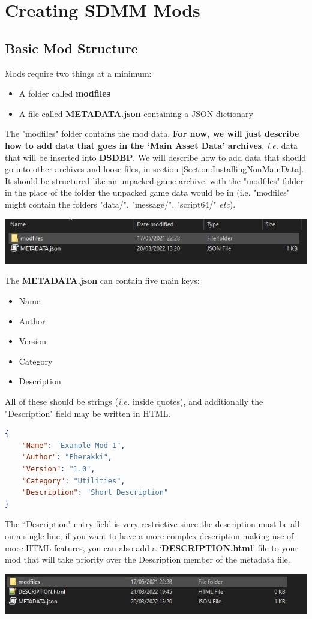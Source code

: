 \documentclass{article}
\begin{document}
\section{Creating SDMM Mods}
\subsection{Basic Mod Structure}
Mods require two things at a minimum:
\begin{itemize}
\item A folder called \textbf{modfiles}
\item A file called \textbf{METADATA.json} containing a JSON dictionary
\end{itemize}
The "modfiles" folder contains the mod data. \textbf{For now, we will just describe how to add data that goes in the `Main Asset Data' archives}, \textit{i.e.} data that will be inserted into \textbf{DSDBP}. We will describe how to add data that should go into other archives and loose files, in section \ref{Section:InstallingNonMainData}. It should be structured like an unpacked game archive, with the "modfiles" folder in the place of the folder the unpacked game data would be in (i.e. "modfiles" might contain the folders "data/", "message/", "script64/" \textit{etc}).\\
\begin{center}
\includegraphics[scale=0.6]{img/mod_contents.jpg}
\end{center}
The \textbf{METADATA.json} can contain five main keys:
\begin{itemize}
\item Name
\item Author
\item Version
\item Category
\item Description
\end{itemize}
All of these should be strings (\textit{i.e.} inside quotes), and additionally the "Description" field may be written in HTML. 
\begin{lstlisting}[language=json,firstnumber=1]
{
    "Name": "Example Mod 1",
    "Author": "Pherakki",
    "Version": "1.0",
    "Category": "Utilities",
    "Description": "Short Description"
}
\end{lstlisting}
\noindent The ``Description" entry field is very restrictive since the description must be all on a single line; if you want to have a more complex description making use of more HTML features, you can also add a `\textbf{DESCRIPTION.html}' file to your mod that will take priority over the Description member of the metadata file.
\begin{center}
\includegraphics[scale=0.6]{img/mod_contents_html.jpg}
\end{center}
\end{document}
